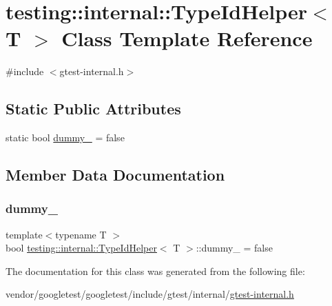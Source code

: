 \hypertarget{classtesting_1_1internal_1_1_type_id_helper}{}\section{testing\+:\+:internal\+:\+:Type\+Id\+Helper$<$ T $>$ Class Template Reference}
\label{classtesting_1_1internal_1_1_type_id_helper}


{\ttfamily \#include $<$gtest-\/internal.\+h$>$}

\subsection*{Static Public Attributes}
\begin{DoxyCompactItemize}
\item 
static bool \hyperlink{classtesting_1_1internal_1_1_type_id_helper_a372268b1520d965d0bdf01ebad3d270e}{dummy\+\_\+} = false
\end{DoxyCompactItemize}


\subsection{Member Data Documentation}
\mbox{\label{classtesting_1_1internal_1_1_type_id_helper_a372268b1520d965d0bdf01ebad3d270e}} 
\subsubsection{\texorpdfstring{dummy\+\_\+}{dummy\_}}
{\footnotesize\ttfamily template$<$typename T $>$ \\
bool \hyperlink{classtesting_1_1internal_1_1_type_id_helper}{testing\+::internal\+::\+Type\+Id\+Helper}$<$ T $>$\+::dummy\+\_\+ = false\hspace{0.3cm}{\ttfamily [static]}}



The documentation for this class was generated from the following file\+:\begin{DoxyCompactItemize}
\item 
vendor/googletest/googletest/include/gtest/internal/\hyperlink{gtest-internal_8h}{gtest-\/internal.\+h}\end{DoxyCompactItemize}
